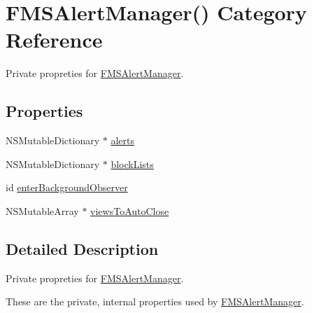 \hypertarget{category_f_m_s_alert_manager_07_08}{\section{F\-M\-S\-Alert\-Manager() Category Reference}
\label{category_f_m_s_alert_manager_07_08}
}


Private propreties for \hyperlink{interface_f_m_s_alert_manager}{F\-M\-S\-Alert\-Manager}.  


\subsection*{Properties}
\begin{DoxyCompactItemize}
\item 
N\-S\-Mutable\-Dictionary $\ast$ \hyperlink{category_f_m_s_alert_manager_07_08_a8342b7dcca068a831fb86301e1ac4cb6}{alerts}
\item 
N\-S\-Mutable\-Dictionary $\ast$ \hyperlink{category_f_m_s_alert_manager_07_08_a559003e1dca7a6551e8986fed1c2b8ee}{block\-Lists}
\item 
id \hyperlink{category_f_m_s_alert_manager_07_08_af04f39bb5a6a173b5bb978b3ede6b50b}{enter\-Background\-Observer}
\item 
N\-S\-Mutable\-Array $\ast$ \hyperlink{category_f_m_s_alert_manager_07_08_a07886820bd55952f2a3ef1e1028ad85e}{views\-To\-Auto\-Close}
\end{DoxyCompactItemize}


\subsection{Detailed Description}
Private propreties for \hyperlink{interface_f_m_s_alert_manager}{F\-M\-S\-Alert\-Manager}. 

These are the private, internal properties used by \hyperlink{interface_f_m_s_alert_manager}{F\-M\-S\-Alert\-Manager}. 

